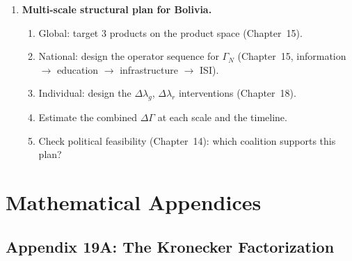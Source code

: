\documentclass[../structural_economics_book.tex]{subfiles}
\begin{document}
\begin{enumerate}[label=\textbf{19.\arabic*}, leftmargin=3em]
\item \textbf{Multi-scale structural plan for Bolivia.}
\begin{enumerate}
\item Global: target 3 products on the product space (Chapter~15).
\item National: design the operator sequence for $\Gamma_N$ (Chapter~15, information $\to$ education $\to$ infrastructure $\to$ ISI).
\item Individual: design the $\Delta\lambda_g$, $\Delta\lambda_r$ interventions (Chapter~18).
\item Estimate the combined $\Delta\Gamma$ at each scale and the timeline.
\item Check political feasibility (Chapter~14): which coalition supports this plan?
\end{enumerate}
\end{enumerate}


\newpage
\section*{Mathematical Appendices}


\subsection*{Appendix 19A: The Kronecker Factorization}
\label{ch19:app:kronecker}
\end{document}
